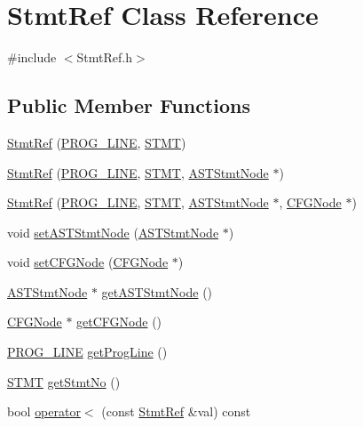 \hypertarget{class_stmt_ref}{\section{Stmt\-Ref Class Reference}
\label{class_stmt_ref}
}


{\ttfamily \#include $<$Stmt\-Ref.\-h$>$}

\subsection*{Public Member Functions}
\begin{DoxyCompactItemize}
\item 
\hyperlink{class_stmt_ref_a5c8f1630c01f8e8ebfac88364cfb9fd7}{Stmt\-Ref} (\hyperlink{std_afx_8h_abcc2d0120d16c2587a85b314010f6399}{P\-R\-O\-G\-\_\-\-L\-I\-N\-E}, \hyperlink{std_afx_8h_a4a876b28ac3f59cecb39c2d2d76e4e7a}{S\-T\-M\-T})
\item 
\hyperlink{class_stmt_ref_a3ec4e5f8a9568d342ee1e3d4dc98c879}{Stmt\-Ref} (\hyperlink{std_afx_8h_abcc2d0120d16c2587a85b314010f6399}{P\-R\-O\-G\-\_\-\-L\-I\-N\-E}, \hyperlink{std_afx_8h_a4a876b28ac3f59cecb39c2d2d76e4e7a}{S\-T\-M\-T}, \hyperlink{class_a_s_t_stmt_node}{A\-S\-T\-Stmt\-Node} $\ast$)
\item 
\hyperlink{class_stmt_ref_a41b557a1e39526e6a26d352960193bdb}{Stmt\-Ref} (\hyperlink{std_afx_8h_abcc2d0120d16c2587a85b314010f6399}{P\-R\-O\-G\-\_\-\-L\-I\-N\-E}, \hyperlink{std_afx_8h_a4a876b28ac3f59cecb39c2d2d76e4e7a}{S\-T\-M\-T}, \hyperlink{class_a_s_t_stmt_node}{A\-S\-T\-Stmt\-Node} $\ast$, \hyperlink{class_c_f_g_node}{C\-F\-G\-Node} $\ast$)
\item 
void \hyperlink{class_stmt_ref_a253c944e7df29b33029081518708366d}{set\-A\-S\-T\-Stmt\-Node} (\hyperlink{class_a_s_t_stmt_node}{A\-S\-T\-Stmt\-Node} $\ast$)
\item 
void \hyperlink{class_stmt_ref_a793f7e7b6509f12584ddb5b0da80164a}{set\-C\-F\-G\-Node} (\hyperlink{class_c_f_g_node}{C\-F\-G\-Node} $\ast$)
\item 
\hyperlink{class_a_s_t_stmt_node}{A\-S\-T\-Stmt\-Node} $\ast$ \hyperlink{class_stmt_ref_aeb7d899a7e16a9bbdab4646a41608a80}{get\-A\-S\-T\-Stmt\-Node} ()
\item 
\hyperlink{class_c_f_g_node}{C\-F\-G\-Node} $\ast$ \hyperlink{class_stmt_ref_a7e8f61d8698e2e9a3446cef18bb0f5b1}{get\-C\-F\-G\-Node} ()
\item 
\hyperlink{std_afx_8h_abcc2d0120d16c2587a85b314010f6399}{P\-R\-O\-G\-\_\-\-L\-I\-N\-E} \hyperlink{class_stmt_ref_a1140e78dc946d46aee78913817f82d3c}{get\-Prog\-Line} ()
\item 
\hyperlink{std_afx_8h_a4a876b28ac3f59cecb39c2d2d76e4e7a}{S\-T\-M\-T} \hyperlink{class_stmt_ref_a576675b7e0acb02f8047601045bb4831}{get\-Stmt\-No} ()
\item 
bool \hyperlink{class_stmt_ref_af8748c9c800ac1675b58033f330be992}{operator$<$} (const \hyperlink{class_stmt_ref}{Stmt\-Ref} \&val) const 
\end{DoxyCompactItemize}


